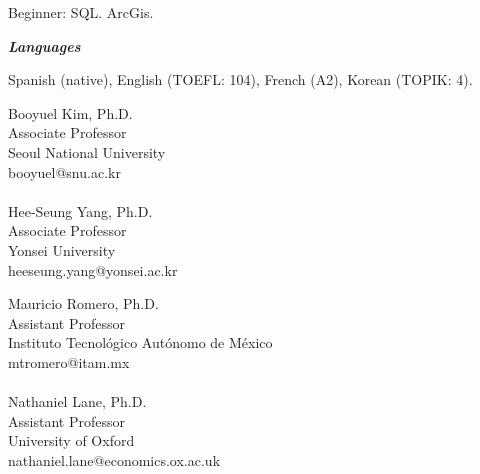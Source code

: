 \documentclass[11pt,article,oneside, a4paper]{memoir}
\begin{document}
\ind Beginner: SQL. ArcGis.

\medskip
\noindent\emph{\textbf{Languages} \vspace{0.05in}}

\ind Spanish (native), English (TOEFL: 104), French (A2), Korean (TOPIK: 4).

\bigskip

\noindent
\begin{minipage}[t]{.5\textwidth}
  \raggedright
  Booyuel Kim, Ph.D.        \\
  Associate Professor       \\
  Seoul National University \\
  booyuel@snu.ac.kr         \\
  ~~                        \\
  Hee-Seung Yang, Ph.D.     \\
  Associate Professor       \\
  Yonsei University         \\
  heeseung.yang@yonsei.ac.kr
\end{minipage}%
\begin{minipage}[t]{.7\textwidth}
\raggedright
  Mauricio Romero, Ph.D.    \\
  Assistant Professor       \\
  Instituto Tecnológico Autónomo de México \\
  mtromero@itam.mx          \\
  ~~                        \\
  Nathaniel Lane, Ph.D.     \\
  Assistant Professor       \\
  University of Oxford      \\
  nathaniel.lane@economics.ox.ac.uk
\end{minipage}
\end{document}
